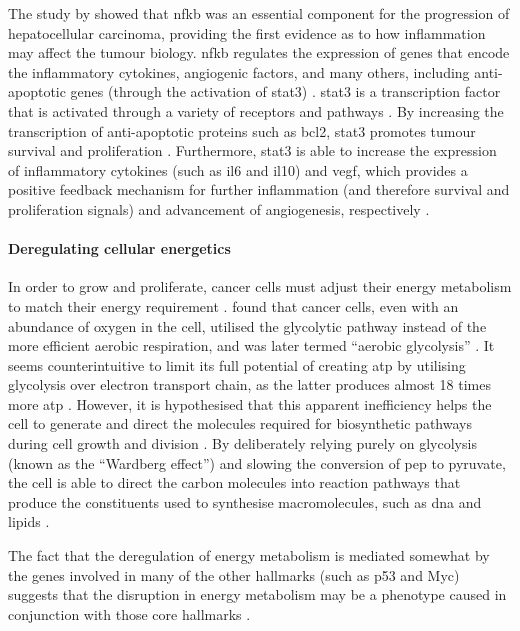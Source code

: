 The study by \citep{Pikarsky2004} showed that \gls{nfkb} was an essential component for the progression of hepatocellular carcinoma, providing the first evidence as to how inflammation may affect the tumour biology.
\gls{nfkb} regulates the expression of genes that encode the inflammatory cytokines, angiogenic factors, and many others, including anti-apoptotic genes (through the activation of \gls{stat3}) \citep{Elinav2013,Mantovani2008}.
\gls{stat3} is a transcription factor that is activated through a variety of receptors and pathways \citep{Yu2007,Yu2014}.
By increasing the transcription of anti-apoptotic proteins such as \gls{bcl2}, \gls{stat3} promotes tumour survival and proliferation \citep{Yu2007}.
Furthermore, \gls{stat3} is able to increase the expression of inflammatory cytokines (such as \gls{il6} and \acrshort{il10}) and \acrshort{vegf}, which provides a positive feedback mechanism for further inflammation (and therefore survival and proliferation signals) and advancement of angiogenesis, respectively \citep{Yu2007}.

\paragraph{Deregulating cellular energetics}

\noindent
In order to grow and proliferate, cancer cells must adjust their energy metabolism to match their energy requirement \citet{Hanahan2011}.
\citet{Wardburg1956} found that cancer cells, even with an abundance of oxygen in the cell, utilised the glycolytic pathway instead of the more efficient aerobic respiration, and was later termed ``aerobic glycolysis'' \citep{Hanahan2011}.
It seems counterintuitive to limit its full potential of creating \gls{atp} by utilising glycolysis over electron transport chain, as the latter produces almost 18 times more \gls{atp} \citep{Hanahan2011, VanderHeiden2009}.
However, it is hypothesised  that this apparent inefficiency helps the cell to generate and direct the molecules required for biosynthetic pathways during cell growth and division \citep{Cairns2011,VanderHeiden2009}.
By deliberately relying purely on glycolysis (known as the ``Wardberg effect'') and slowing the conversion of \gls{pep} to pyruvate, the cell is able to direct the carbon molecules into reaction pathways that produce the constituents used to synthesise macromolecules, such as \acrshort{dna} and lipids \citep{Cairns2011,VanderHeiden2009}.

The fact that the deregulation of energy metabolism is mediated somewhat by the genes involved in many of the other hallmarks (such as p53 and Myc) suggests that the disruption in energy metabolism may be a phenotype caused in conjunction with those core hallmarks \citep{Hanahan2011}.

